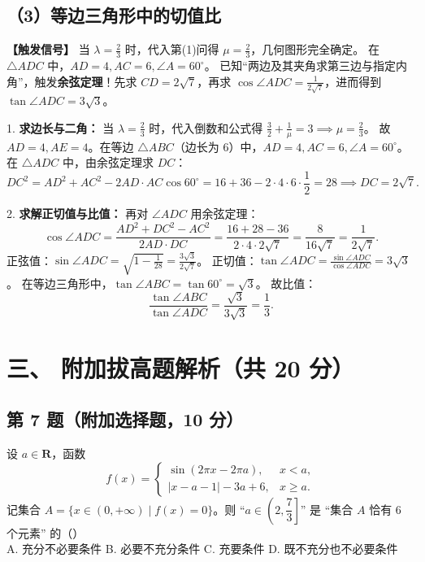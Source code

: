 \documentclass[11pt,a4paper,fontset=fandol]{ctexart}
\newcommand{\ans}[1]{\boxed{#1}}
\begin{document}
\subsection*{（3）等边三角形中的切值比}

\noindent\textbf{【触发信号】}
当 $\lambda = \frac{2}{3}$ 时，代入第(1)问得 $\mu = \frac{2}{3}$，几何图形完全确定。
在 $\triangle ADC$ 中，$AD = 4, AC = 6, \angle A = 60^\circ$。
已知“两边及其夹角求第三边与指定内角”，触发\textbf{余弦定理}！先求 $CD = 2\sqrt{7}$，再求 $\cos\angle ADC = \frac{1}{2\sqrt{7}}$，进而得到 $\tan\angle ADC = 3\sqrt{3}$。

1. \textbf{求边长与二角：}
当 $\lambda = \frac{2}{3}$ 时，代入倒数和公式得 $\frac{3}{2} + \frac{1}{\mu} = 3 \implies \mu = \frac{2}{3}$。
故 $AD = 4, AE = 4$。在等边 $\triangle ABC$（边长为 6）中，$AD = 4, AC = 6, \angle A = 60^\circ$。
在 $\triangle ADC$ 中，由余弦定理求 $DC$：
\[
DC^2 = AD^2 + AC^2 - 2AD \cdot AC \cos 60^\circ = 16 + 36 - 2 \cdot 4 \cdot 6 \cdot \frac{1}{2} = 28 \implies DC = 2\sqrt{7}.
\]

2. \textbf{求解正切值与比值：}
再对 $\angle ADC$ 用余弦定理：
\[
\cos\angle ADC = \frac{AD^2 + DC^2 - AC^2}{2AD \cdot DC} = \frac{16 + 28 - 36}{2 \cdot 4 \cdot 2\sqrt{7}} = \frac{8}{16\sqrt{7}} = \frac{1}{2\sqrt{7}}.
\]
正弦值：$\sin\angle ADC = \sqrt{1 - \frac{1}{28}} = \frac{3\sqrt{3}}{2\sqrt{7}}$。
正切值：$\tan\angle ADC = \frac{\sin\angle ADC}{\cos\angle ADC} = 3\sqrt{3}$。
在等边三角形中，$\tan\angle ABC = \tan 60^\circ = \sqrt{3}$。
故比值：
\[
\frac{\tan\angle ABC}{\tan\angle ADC} = \frac{\sqrt{3}}{3\sqrt{3}} = \ans{\frac{1}{3}}.
\]

\newpage
\section*{三、 附加拔高题解析（共 20 分）}

\subsection*{第 7 题（附加选择题，10 分）}

\begin{problembox}
设 \(a \in \mathbf{R}\)，函数 
\[
f(x) = \begin{cases} 
\sin(2\pi x - 2\pi a), & x < a,\\[0.4em]
|x - a - 1| - 3a + 6, & x \ge a. 
\end{cases}
\]
记集合 \(A = \{x \in (0, +\infty) \mid f(x) = 0\}\)。则 “\(a \in \left(2, \dfrac{7}{3}\right]\)” 是 “集合 \(A\) 恰有 \(6\) 个元素” 的（\qquad）\\[0.4em]
A. 充分不必要条件 \qquad B. 必要不充分条件 \qquad C. 充要条件 \qquad D. 既不充分也不必要条件
\end{problembox}
\end{document}
